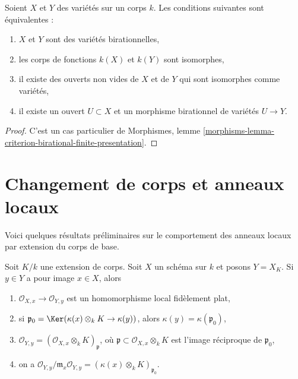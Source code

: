 \begin{lemma}
\label{lemma-birational-varieties}
Soient $X$ et $Y$ des variétés sur un corps $k$.
Les conditions suivantes sont équivalentes :
\begin{enumerate}
\item $X$ et $Y$ sont des variétés birationnelles,
\item les corps de fonctions $k(X)$ et $k(Y)$ sont isomorphes,
\item il existe des ouverts non vides de $X$ et de $Y$ qui sont
isomorphes comme variétés,
\item il existe un ouvert $U \subset X$ et un morphisme
birationnel de variétés $U \to Y$.
\end{enumerate}
\end{lemma}

\begin{proof}
C'est un cas particulier de Morphismes, lemme
\ref{morphisms-lemma-criterion-birational-finite-presentation}.
\end{proof}







\section{Changement de corps et anneaux locaux}
\label{section-local-rings}

\noindent
Voici quelques résultats préliminaires sur le comportement des
anneaux locaux par extension du corps de base.

\begin{lemma}
\label{lemma-change-fields-flat}
Soit $K/k$ une extension de corps. Soit $X$ un schéma sur $k$
et posons $Y = X_K$. Si $y \in Y$ a pour image $x \in X$, alors
\begin{enumerate}
\item $\mathcal{O}_{X, x} \to \mathcal{O}_{Y, y}$ est un
homomorphisme local fidèlement plat,
\item si $\mathfrak p_0 = \Ker(\kappa(x) \otimes_k K \to \kappa(y))$,
alors $\kappa(y) = \kappa(\mathfrak p_0)$,
\item $\mathcal{O}_{Y, y} =
(\mathcal{O}_{X, x} \otimes_k K)_\mathfrak p$, où
$\mathfrak p \subset \mathcal{O}_{X, x} \otimes_k K$ est l'image
réciproque de $\mathfrak p_0$,
\item on a
$\mathcal{O}_{Y, y}/\mathfrak m_x\mathcal{O}_{Y, y} =
(\kappa(x) \otimes_k K)_{\mathfrak p_0}$.
\end{enumerate}
\end{lemma}

